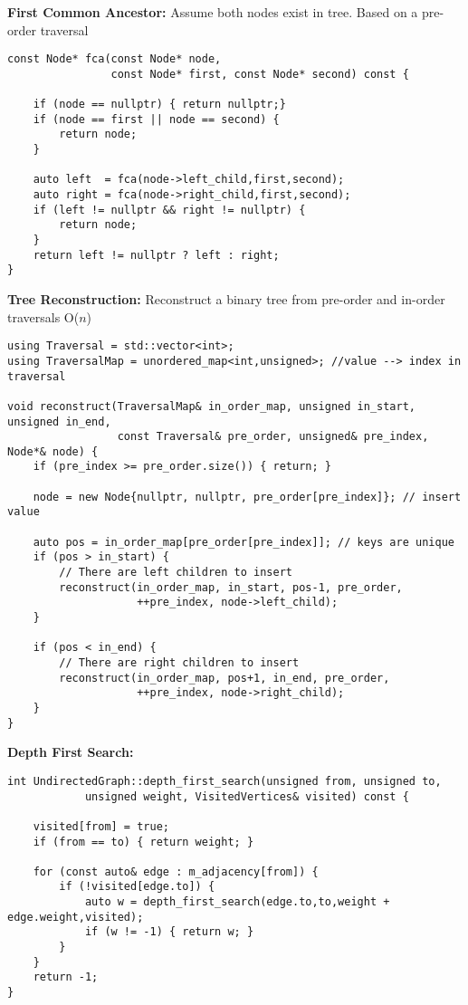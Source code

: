 \documentclass[12pt]{article}
\newcommand{\ON}{O($n$) }
\begin{document}
\newpage
\noindent
\textbf{First Common Ancestor:}
Assume both nodes exist in tree.  Based on a pre-order traversal

\begin{lstlisting}[frame=single]
const Node* fca(const Node* node, 
                const Node* first, const Node* second) const {

    if (node == nullptr) { return nullptr;}
    if (node == first || node == second) {
        return node;
    }

    auto left  = fca(node->left_child,first,second);
    auto right = fca(node->right_child,first,second);
    if (left != nullptr && right != nullptr) {
        return node;
    }
    return left != nullptr ? left : right;
}
\end{lstlisting}

\vspace{5mm}
\noindent
\textbf{Tree Reconstruction:}
Reconstruct a binary tree from pre-order and in-order traversals \ON

\begin{lstlisting}[frame=single]
using Traversal = std::vector<int>;
using TraversalMap = unordered_map<int,unsigned>; //value --> index in traversal

void reconstruct(TraversalMap& in_order_map, unsigned in_start, unsigned in_end,
                 const Traversal& pre_order, unsigned& pre_index, Node*& node) {
    if (pre_index >= pre_order.size()) { return; }

    node = new Node{nullptr, nullptr, pre_order[pre_index]}; // insert value

    auto pos = in_order_map[pre_order[pre_index]]; // keys are unique
    if (pos > in_start) {
        // There are left children to insert
        reconstruct(in_order_map, in_start, pos-1, pre_order, 
                    ++pre_index, node->left_child);
    }

    if (pos < in_end) {
        // There are right children to insert 
        reconstruct(in_order_map, pos+1, in_end, pre_order, 
                    ++pre_index, node->right_child);
    }
}
\end{lstlisting}

\vspace{5mm}
\noindent
\textbf{Depth First Search:}
\begin{lstlisting}[frame=single]
int UndirectedGraph::depth_first_search(unsigned from, unsigned to,
            unsigned weight, VisitedVertices& visited) const {

    visited[from] = true;
    if (from == to) { return weight; }

    for (const auto& edge : m_adjacency[from]) {
        if (!visited[edge.to]) {
            auto w = depth_first_search(edge.to,to,weight + edge.weight,visited);
            if (w != -1) { return w; }
        }
    }
    return -1;
}
\end{lstlisting}
\end{document}

